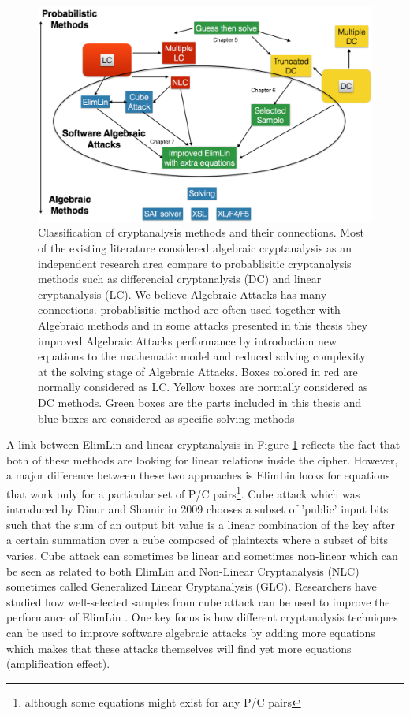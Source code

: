 \begin{figure}[h!]
	\centering
	\includegraphics[width=140mm]{./pics/TestACConection.png}	
	\caption[Classification of cryptanalysis methods and their connections]{Classification of cryptanalysis methods and their connections. Most of the existing literature considered algebraic cryptanalysis as an independent research area compare to probablisitic cryptanalysis methods such as differencial cryptanalysis (DC) and linear cryptanalysis (LC). We believe Algebraic Attacks has many connections. probablisitic method are often used together with Algebraic methods and in some attacks presented in this thesis they improved Algebraic Attacks performance by introduction new equations to the mathematic model and reduced solving complexity at the solving stage of Algebraic Attacks. Boxes colored in red are normally considered as LC. Yellow boxes are normally considered as DC methods. Green boxes are the parts included in this thesis and blue boxes are considered as specific solving methods}
	\label{fig:ch3general}
\end{figure}	

A link between ElimLin and linear cryptanalysis in Figure \ref{fig:ch3general} reflects the fact that both of these methods are looking for linear relations inside the cipher. However, a major difference between these two approaches is ElimLin looks for equations that work only for a particular set of P/C pairs\footnote{although some equations might exist for any P/C pairs}. Cube attack which was introduced by Dinur and Shamir in 2009 \cite{dinur2009cube} chooses a subset of 'public' input bits such that the sum of an output bit value is a linear combination of the key after a certain summation over a cube composed of plaintexts where a subset of bits varies. Cube attack can sometimes be linear and sometimes non-linear which can be seen as related to both ElimLin and Non-Linear Cryptanalysis (NLC) sometimes called Generalized Linear Cryptanalysis (GLC). Researchers have studied how well-selected samples from cube attack can be used to improve the performance of ElimLin \cite{suvsil2016selection}. One key focus is how different cryptanalysis techniques can be used to improve software algebraic attacks by adding more equations which makes that these attacks themselves will find yet more equations (amplification effect). 

